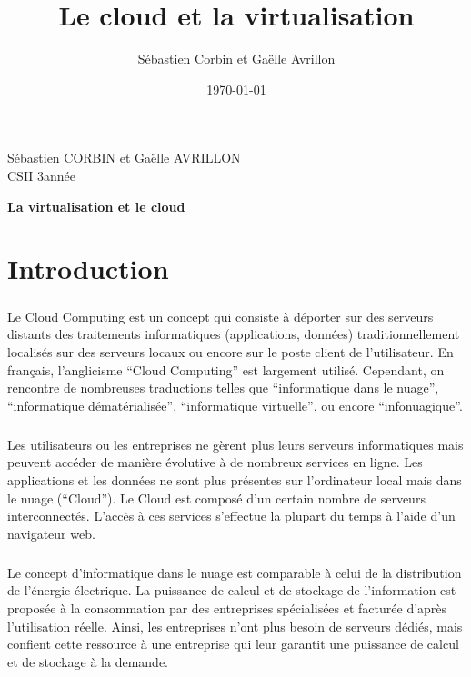 \documentclass[a4paper,12pt]{report}
\title{Le cloud et la virtualisation}
\author{Sébastien Corbin et Gaëlle Avrillon}
\date{\today}
\begin{document}
\begin{onehalfspace}

		\begin{titlepage}
			\begin{center}
				Sébastien CORBIN et Gaëlle AVRILLON\\
				CSII 3\ieme année\\
			\end{center}
			\hrulefill
			\vspace{7cm}
			\begin{center} 
				\LARGE \textbf{La virtualisation et le cloud}\\
			\end{center}
		\end{titlepage}
		\newpage

		\setcounter{page}{1}
		\thispagestyle{empty}
		\newpage

	\chapter*{Introduction}
	
	\paragraph*{}
	Le Cloud Computing est un concept qui consiste à déporter sur des serveurs distants des traitements informatiques (applications, données) traditionnellement localisés sur des serveurs locaux ou encore sur le poste client de l’utilisateur. En français, l’anglicisme “Cloud Computing” est largement utilisé. Cependant, on rencontre de nombreuses traductions telles que “informatique dans le nuage”, “informatique dématérialisée”, “informatique virtuelle”, ou encore “infonuagique”.

	\paragraph*{}
	Les utilisateurs ou les entreprises ne gèrent plus leurs serveurs informatiques mais peuvent accéder de manière évolutive à de nombreux services en ligne. Les applications et les données ne sont plus présentes sur l’ordinateur local mais dans le nuage (“Cloud”). Le Cloud est composé d’un certain nombre de serveurs interconnectés. L’accès à ces services s’effectue la plupart du temps à l’aide d’un navigateur web.
	
	\paragraph*{}
	Le concept d'informatique dans le nuage est comparable à celui de la distribution de l'énergie électrique. La puissance de calcul et de stockage de l'information est proposée à la consommation par des entreprises spécialisées et facturée d'après l'utilisation réelle. Ainsi, les entreprises n'ont plus besoin de serveurs dédiés, mais confient cette ressource à une entreprise qui leur garantit une puissance de calcul et de stockage à la demande.
	

\end{onehalfspace}
\end{document}
